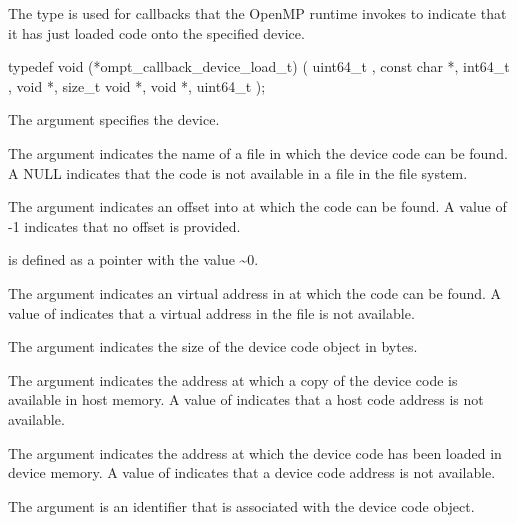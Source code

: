 \summary
The  type is used for callbacks that 
the OpenMP runtime invokes to indicate that it has just loaded code onto 
the specified device.

\format
\begin{ccppspecific}
\begin{omptCallback}
typedef void (*ompt_callback_device_load_t) (
  uint64_t ,
  const char *,
  int64_t ,
  void *,
  size_t 
  void *,
  void *,
  uint64_t 
);
\end{omptCallback}
\end{ccppspecific}

\argdesc
The  argument specifies the device.

The  argument indicates the name of a file in which the device 
code can be found. A NULL  indicates that the code is not available 
in a file in the file system.

The  argument indicates an offset into  at 
which the code can be found. A value of -1 indicates that no offset is provided.

 is defined as a pointer with the value \textasciitilde 0.

The  argument indicates an virtual address in  
at which the code can be found. A value of  indicates that 
a virtual address in the file is not available.

The argument  indicates the size of the device code object in bytes.

The  argument indicates the address at which a copy of the device 
code is available in host memory. A value of  indicates that 
a host code address is not available.

The  argument indicates the address at which the device code has 
been loaded in device memory. A value of  indicates that a 
device code address is not available.

The  argument is an identifier that is associated with the device 
code object.

